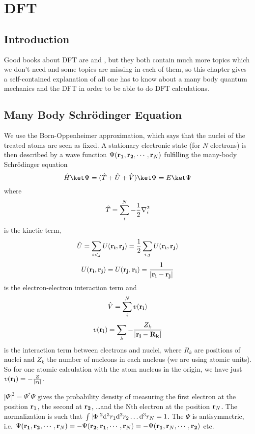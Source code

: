 \chapter{DFT}

\section{Introduction}

Good books about DFT are \cite{DFT} and \cite{martin}, but they both contain
much more topics which we don't need and some topics are missing in each of
them, so this chapter gives a self-contained explanation of all one has to know
about a many body quantum mechanics and the DFT in order to be able to do DFT
calculations.

\section{Many Body Schr\"odinger Equation}

We use the Born-Oppenheimer approximation, which says that the nuclei of the
treated atoms are seen as fixed. A stationary electronic state (for $N$
electrons) is then described by a wave function $\Psi({\bf r_1},{\bf
r_2},\cdots,{\bf r}_N)$ fulfilling the many-body Schr\"odinger equation
$$\hat H\ket\Psi=(\hat T+\hat U+\hat V)\ket\Psi=E\ket\Psi$$
where
$$\hat T = \sum_i^N -{1\over2}\nabla_i^2$$
is the kinetic term,
$$\hat U = \sum_{i<j}U({\bf r_i},{\bf r_j})=
{1\over2}\sum_{i,j}U({\bf r_i},{\bf r_j})$$
$$U({\bf r_i},{\bf r_j})=U({\bf r_j},{\bf r_i})={1\over|{\bf r_i}-{\bf r_j}|}$$
is the electron-electron interaction term and
$$\hat V = \sum_i^N v({\bf r_i})$$
$$v({\bf r_i})=\sum_k -{Z_k\over|{\bf r_i}-{\bf R_k}|}$$
is the interaction term between electrons and nuclei,
where $R_k$ are positions of nuclei and $Z_k$ the number of nucleons in each
nucleus (we are using atomic units). So for one atomic calculation with the
atom nucleus in the origin, we have
just $v({\bf r_i})=-{Z\over|{\bf r_i}|}$.

$|\Psi|^2=\Psi^*\Psi$ gives the probability density of measuring the first
electron at the position $\bf r_1$, the second at $\bf r_2$, \dots and the Nth
electron at the position ${\bf r}_N$. The normalization is such that 
$\int |\Phi|^2{\rm d}^3 r_1{\rm d}^3 r_2\dots{\rm d}^3 r_N=1$.
The $\Psi$ is antisymmetric, i.e. 
$
\Psi({\bf r_1},{\bf r_2},\cdots,{\bf r}_N)=
-\Psi({\bf r_2},{\bf r_1},\cdots,{\bf r}_N)=
-\Psi({\bf r_1},{\bf r}_N,\cdots,{\bf r_2})
$ etc.

